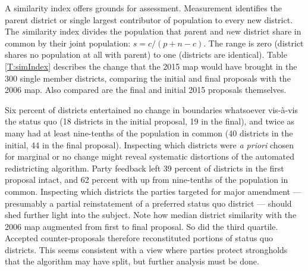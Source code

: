 \documentclass[letter,12pt]{article}
\begin{document}
A similarity index \citep[][:15--7]{cox.katz.2002} offers grounds for assessment. Measurement identifies the parent district or single largest contributor of population to every new district. The $s$imilarity index divides the population that $p$arent and $n$ew district share in $c$ommon by their joint population: $s = c / (p + n - c)$. The range is zero (district shares no population at all with parent) to one (districts are identical). Table \ref{T:simIndex} describes the change that the 2015 map would have brought in the 300 single member districts, comparing the initial and final proposals with the 2006 map. Also compared are the final and initial 2015 proposals themselves. 

Six percent of districts entertained no change in boundaries whatsoever vis-\`a-vis the status quo (18 districts in the initial proposal, 19 in the final), and twice as many had at least nine-tenths of the population in common (40 districts in the initial, 44 in the final proposal). Inspecting which districts were \emph{a priori} chosen for marginal or no change might reveal systematic distortions of the automated redistricting algorithm. Party feedback left 39 percent of districts in the first proposal intact, and 62 percent with up from nine-tenths of the population in common. Inspecting which districts the parties targeted for major amendment --- presumably a partial reinstatement of a preferred status quo district --- should shed further light into the subject. Note how median district similarity with the 2006 map augmented from first to final proposal. So did the third quartile. Accepted counter-proposals therefore reconstituted portions of status quo districts. This seems consistent with a view where parties protect strongholds that the algorithm may have split, but further analysis must be done. 


\end{document}
